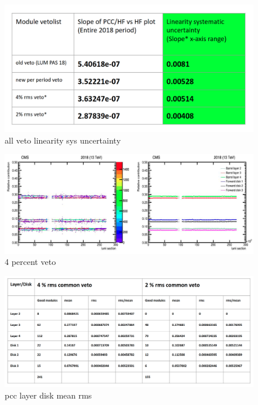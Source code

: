 \begin{figure}[!htp]
\centering
\includegraphics[width=1\textwidth]{ashish_thesis/lineairty_diff_veto_sys_unc.png}
\caption{%
all veto linearity sys uncertainty
}
\label{fig:linearitysys}
\end{figure}

\begin{figure}[!htp]
\centering
\includegraphics[width=1\textwidth]{ashish_thesis/pcc_layer_disk_stability_4_commonveto.png}
\caption{%
4 percent veto
}
\label{fig:4perdisklayerstab}
\end{figure}

\begin{figure}[!htp]
\centering
\includegraphics[width=1\textwidth]{ashish_thesis/pcc_layer_disk_mean_rms.png}
\caption{%
pcc layer disk mean rms
}
\label{fig:pixellalyerdiskmeanrms}
\end{figure}


